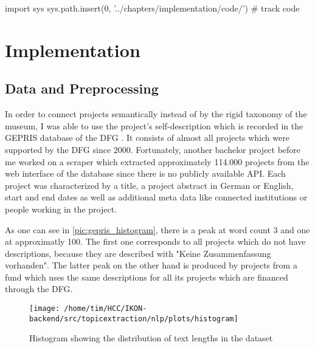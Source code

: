 % 
\begin{pycode}
import sys
sys.path.insert(0, '../chapters/implementation/code/')
# track code

\end{pycode}

\chapter{Implementation}
\label{chap:implementation}

\section{Data and Preprocessing}
In order to connect projects semantically instead of by the rigid taxonomy of the museum, I was able to use the project's self-description which is recorded in the GEPRIS database of the DFG \cite{DFGGEPRIS}. It consists of almost all projects which were supported by the DFG since 2000. Fortunately, another bachelor project before me worked on a scraper which extracted approximately 114.000 projects from the web interface of the database since there is no publicly available API. Each project was characterized by a title, a project abstract in German or English, start and end dates as well as additional meta data like connected institutions or people working in the project.

As one can see in \autoref{pic:gepris_histogram}, there is a peak at word count 3 and one at approximatly 100. The first one corresponds to all projects which do not have descriptions, because they are described with "Keine Zusammenfassung vorhanden". The latter peak on the other hand is produced by projects from a fund which uses the same descriptions for all its projects which are financed through the DFG.

\begin{figure}[t]
	\centering
	\texttt{[image: /home/tim/HCC/IKON-backend/src/topicextraction/nlp/plots/histogram]}
	\caption{\label{pic:gepris_histogram} Histogram showing the distribution of text lengths in the dataset}
\end{figure}


